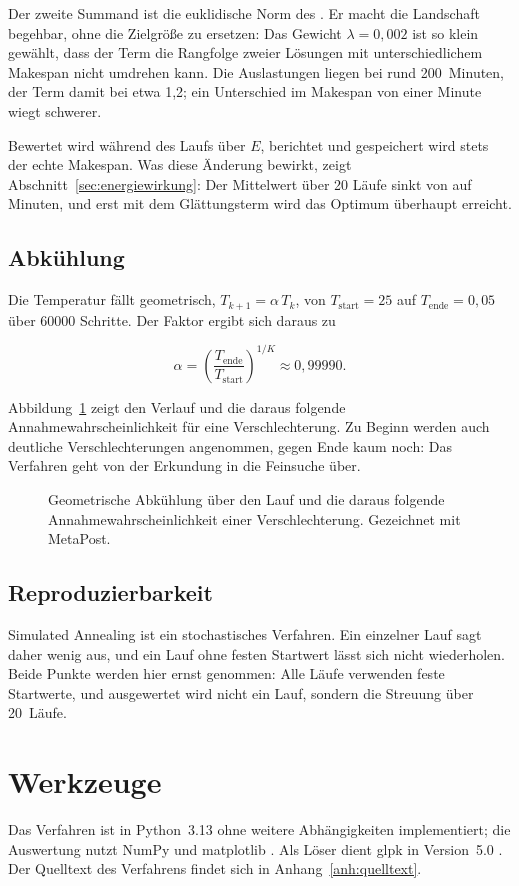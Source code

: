 Der zweite Summand ist die euklidische Norm des
. Er macht die Landschaft begehbar, ohne die
Zielgröße zu ersetzen: Das Gewicht $\lambda = 0{,}002$ ist so klein
gewählt, dass der Term die Rangfolge zweier Lösungen mit
unterschiedlichem Makespan nicht umdrehen kann. Die Auslastungen liegen
bei rund 200~Minuten, der Term damit bei etwa 1,2; ein Unterschied im
Makespan von einer Minute wiegt schwerer.

Bewertet wird während des Laufs über $E$, berichtet und gespeichert wird
stets der echte Makespan. Was diese Änderung bewirkt, zeigt
Abschnitt~\ref{sec:energiewirkung}: Der Mittelwert über 20 Läufe sinkt
von \SaRohMittel{} auf \SaMittel{} Minuten, und erst mit dem
Glättungsterm wird das Optimum überhaupt erreicht.

\subsection{Abkühlung}

Die Temperatur fällt geometrisch, $T_{k+1} = \alpha\,T_k$, von
$T_{\text{start}} = 25$ auf $T_{\text{ende}} = 0{,}05$ über
\num{60000} Schritte. Der Faktor ergibt sich daraus zu

\begin{equation}
  \alpha = \left(\frac{T_{\text{ende}}}{T_{\text{start}}}\right)^{1/K}
  \approx 0{,}99990.
\end{equation}

Abbildung~\ref{abb:abkuehlung} zeigt den Verlauf und die daraus
folgende Annahmewahrscheinlichkeit für eine Verschlechterung. Zu Beginn
werden auch deutliche Verschlechterungen angenommen, gegen Ende kaum
noch: Das Verfahren geht von der Erkundung in die Feinsuche über.

\begin{figure}[tb]
  \centering
  
  \caption[Abkühlung und Annahmewahrscheinlichkeit]{Geometrische
    Abkühlung über den Lauf und die daraus folgende
    Annahmewahrscheinlichkeit einer Verschlechterung. Gezeichnet mit
    MetaPost.}
  \label{abb:abkuehlung}
\end{figure}

\subsection{Reproduzierbarkeit}

Simulated Annealing ist ein stochastisches Verfahren. Ein einzelner Lauf
sagt daher wenig aus, und ein Lauf ohne festen Startwert lässt sich
nicht wiederholen. Beide Punkte werden hier ernst genommen: Alle Läufe
verwenden feste Startwerte, und ausgewertet wird nicht ein Lauf, sondern
die Streuung über 20~Läufe.

\section{Werkzeuge}

Das Verfahren ist in Python~3.13 ohne weitere Abhängigkeiten
implementiert; die Auswertung nutzt NumPy \parencite{harris2020array}
und matplotlib \parencite{hunter2007matplotlib}. Als Löser dient
\ac{glpk} in Version~5.0 \parencite{glpk}. Der Quelltext des Verfahrens
findet sich in Anhang~\ref{anh:quelltext}.
